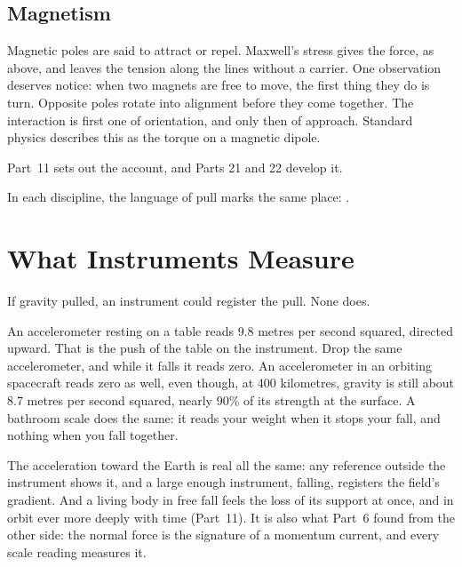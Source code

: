 \documentclass[11pt,a4paper]{article}
\begin{document}
\subsection*{Magnetism}

Magnetic poles are said to attract or repel. Maxwell's stress gives the force, as above, and leaves the tension along the lines without a carrier. One observation deserves notice: when two magnets are free to move, the first thing they do is turn. Opposite poles rotate into alignment before they come together. The interaction is first one of orientation, and only then of approach. Standard physics describes this as the torque on a magnetic dipole.

  Part~11 sets out the account, and Parts 21 and 22 develop it.

In each discipline, the language of pull marks the same place: .

\section{What Instruments Measure}
\label{sec:instruments}

If gravity pulled, an instrument could register the pull. None does.

An accelerometer resting on a table reads 9.8 metres per second squared, directed upward. That is the push of the table on the instrument. Drop the same accelerometer, and while it falls it reads zero. An accelerometer in an orbiting spacecraft reads zero as well, even though, at 400 kilometres, gravity is still about 8.7 metres per second squared, nearly 90\% of its strength at the surface. A bathroom scale does the same: it reads your weight when it stops your fall, and nothing when you fall together.

 The acceleration toward the Earth is real all the same: any reference outside the instrument shows it, and a large enough instrument, falling, registers the field's gradient. And a living body in free fall feels the loss of its support at once, and in orbit ever more deeply with time (Part~11). It is also what Part~6 found from the other side: the normal force is the signature of a momentum current, and every scale reading measures it. 
\end{document}

